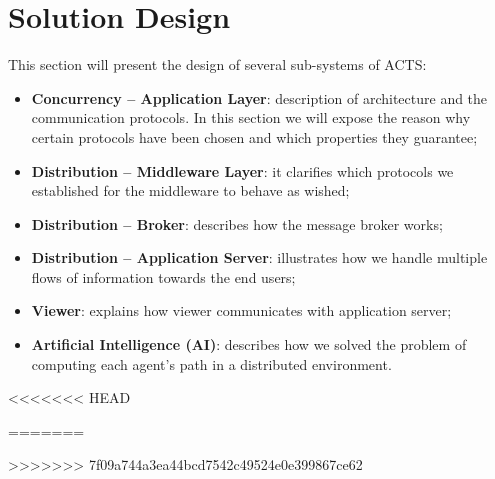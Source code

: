 \section{Solution Design}

This section will present the design of several sub-systems of ACTS:

\begin{itemize}
\item \textbf{Concurrency -- Application Layer}:
  description of architecture and the communication protocols.
  In this section we
  will expose the reason why certain protocols have been chosen and which
  properties they guarantee;
\item \textbf{Distribution -- Middleware Layer}:
  it clarifies which protocols
  we established for the middleware to behave as wished;
\item \textbf{Distribution -- Broker}:
  describes how the message broker works;
\item \textbf{Distribution -- Application Server}:
  illustrates how we handle multiple flows of information towards the end
  users;
\item \textbf{Viewer}:
  explains how viewer communicates with application server;
\item \textbf{Artificial Intelligence (AI)}:
  describes how we solved the problem of computing each agent's path
  in a distributed environment.
\end{itemize}





<<<<<<< HEAD





=======

>>>>>>> 7f09a744a3ea44bcd7542c49524e0e399867ce62
